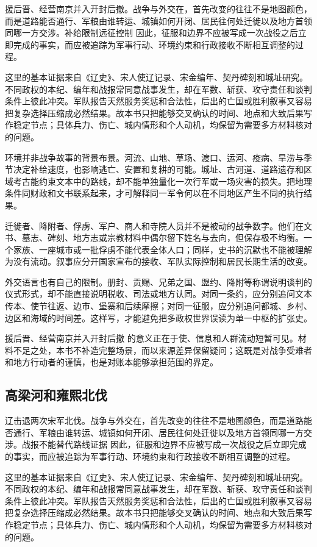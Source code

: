 援后晋、经营南京并入开封后撤。战争与外交在，首先改变的往往不是地图颜色，而是道路能否通行、军粮由谁转运、城镇如何开闭、居民往何处迁徙以及地方首领同哪一方交涉。补给限制远征控制 因此，征服和边界不应被写成一次战役之后立即完成的事实，而应被追踪为军事行动、环境约束和行政接收不断相互调整的过程。

这里的基本证据来自《辽史》、宋人使辽记录、宋金编年、契丹碑刻和城址研究。不同政权的本纪、编年和战报常同意战事发生，却在军数、斩获、攻守责任和谈判条件上彼此冲突。军队报告天然服务奖惩和合法性，后出的亡国或胜利叙事又容易把复杂选择压缩成必然结果。故本书只把能够交叉确认的时间、地点和大致后果写作稳定节点；具体兵力、伤亡、城内情形和个人动机，均保留为需要多方材料核对的问题。

环境并非战争故事的背景布景。河流、山地、草场、渡口、运河、疫病、旱涝与季节决定补给速度，也影响逃亡、安置和复耕的可能。城址、古河道、道路遗存和区域考古能约束文本中的路线，却不能单独量化一次行军或一场灾害的损失。把地理条件同财政和文书联系起来，才可解释同一军令何以在不同地区产生不同的执行结果。

迁徙者、降附者、俘虏、军户、商人和寺院人员并不是被动的战争数字。他们在文书、墓志、碑刻、地方志或宗教材料中偶尔留下姓名与去向，但保存极不均衡。一个家族、一座城市或一批俘虏不能代表全体人口；同样，史书的沉默也不能被理解为没有流动。叙事应分开国家宣布的接收、军队实际控制和居民长期生活的改变。

外交语言也有自己的限制。册封、贡赐、兄弟之国、盟约、降附等称谓说明谈判的仪式形式，却不能直接说明税收、司法或地方认同。对同一条约，应分别追问文本传本、使节往返、边市、堡寨和后续摩擦；对同一征服，应分别追问都城、乡村、边区和海域的时间差。这样写，才能避免把多政权世界误读为单一中枢的扩张史。

援后晋、经营南京并入开封后撤 的意义正在于使、信息和人群流动短暂可见。材料不足之处，本书不补造完整场景，而以来源差异保留疑问；这既是对战争受难者和地方行动者的谨慎，也是对账本能够承担范围的界定。

\subsection{高梁河和雍熙北伐}

辽击退两次宋军北伐。战争与外交在，首先改变的往往不是地图颜色，而是道路能否通行、军粮由谁转运、城镇如何开闭、居民往何处迁徙以及地方首领同哪一方交涉。战报不能替代路线证据 因此，征服和边界不应被写成一次战役之后立即完成的事实，而应被追踪为军事行动、环境约束和行政接收不断相互调整的过程。

这里的基本证据来自《辽史》、宋人使辽记录、宋金编年、契丹碑刻和城址研究。不同政权的本纪、编年和战报常同意战事发生，却在军数、斩获、攻守责任和谈判条件上彼此冲突。军队报告天然服务奖惩和合法性，后出的亡国或胜利叙事又容易把复杂选择压缩成必然结果。故本书只把能够交叉确认的时间、地点和大致后果写作稳定节点；具体兵力、伤亡、城内情形和个人动机，均保留为需要多方材料核对的问题。

